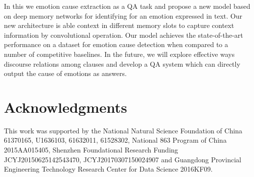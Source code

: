 \documentclass[11pt,letterpaper]{article}
\begin{document}
\begin{CJK*}{UTF8}{gbsn}
In this 
we 
emotion cause extraction as a QA task and propose a new model based on deep memory networks for identifying 
for an emotion expressed in text. 
Our new  architecture is able 
context in different memory slots to capture 
context information  by convolutional operation. Our model achieves the state-of-the-art performance on a dataset for emotion cause detection when compared to a number of competitive baselines. In the future, we will explore effective ways 
discourse relations among clauses and develop a QA system which can directly output the cause of emotions as answers.






\section*{Acknowledgments}

This work was supported by the National Natural Science Foundation of China 61370165, U1636103, 61632011, 61528302, National 863 Program of China 2015AA015405, Shenzhen Foundational Research Funding JCYJ20150625142543470, JCYJ20170307150024907 and Guangdong Provincial Engineering Technology Research Center for Data Science 2016KF09.




\clearpage\end{CJK*}
\end{document}
